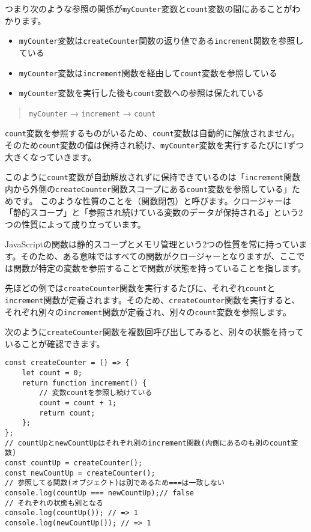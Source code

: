 つまり次のような参照の関係が\texttt{myCounter}変数と\texttt{count}変数の間にあることがわかります。

\begin{itemize}
\item
  \texttt{myCounter}変数は\texttt{createCounter}関数の返り値である\texttt{increment}関数を参照している
\item
  \texttt{myCounter}変数は\texttt{increment}関数を経由して\texttt{count}変数を参照している
\item
  \texttt{myCounter}変数を実行した後も\texttt{count}変数への参照は保たれている
\end{itemize}

\begin{quote}
\texttt{myCounter} →
\texttt{increment} →
\texttt{count}
\end{quote}

\texttt{count}変数を参照するものがいるため、\texttt{count}変数は自動的に解放されません。
そのため\texttt{count}変数の値は保持され続け、\texttt{myCounter}変数を実行するたびに1ずつ大きくなっていきます。

このように\texttt{count}変数が自動解放されずに保持できているのは「\texttt{increment}関数内から外側の\texttt{createCounter}関数スコープにある\texttt{count}変数を参照している」ためです。
このような性質のことを\textbf{}（関数閉包）と呼びます。クロージャーは「静的スコープ」と「参照され続けている変数のデータが保持される」という2つの性質によって成り立っています。

JavaScriptの関数は静的スコープとメモリ管理という2つの性質を常に持っています。そのため、ある意味ではすべての関数がクロージャーとなりますが、ここでは関数が特定の変数を参照することで関数が状態を持っていることを指します。

先ほどの例では\texttt{createCounter}関数を実行するたびに、それぞれ\texttt{count}と\texttt{increment}関数が定義されます。そのため、\texttt{createCounter}関数を実行すると、それぞれ別々の\texttt{increment}関数が定義され、別々の\texttt{count}変数を参照します。

次のように\texttt{createCounter}関数を複数回呼び出してみると、別々の状態を持っていることが確認できます。

\begin{lstlisting}
const createCounter = () => {
    let count = 0;
    return function increment() {
        // 変数countを参照し続けている
        count = count + 1;
        return count;
    };
};
// countUpとnewCountUpはそれぞれ別のincrement関数(内側にあるのも別のcount変数)
const countUp = createCounter();
const newCountUp = createCounter();
// 参照してる関数(オブジェクト)は別であるため===は一致しない
console.log(countUp === newCountUp);// false
// それぞれの状態も別となる
console.log(countUp()); // => 1
console.log(newCountUp()); // => 1
\end{lstlisting}

